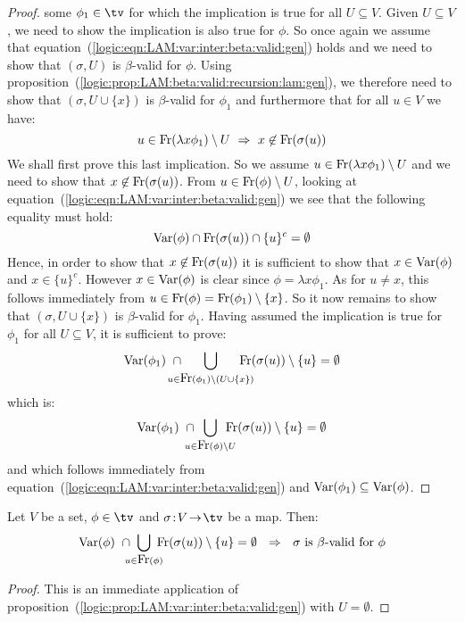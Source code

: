 \begin{proof}
    some $\phi_{1}\in\tv$ for which the implication is true for all
    $U\subseteq V$. Given $U\subseteq V$, we need to show the implication
    is also true for $\phi$. So once again we assume that
    equation~(\ref{logic:eqn:LAM:var:inter:beta:valid:gen}) holds and we
    need to show that $(\sigma,U)$ is $\beta$-valid for $\phi$. Using
    proposition~(\ref{logic:prop:LAM:beta:valid:recursion:lam:gen}), we 
    therefore need to show that $(\sigma, U\cup\{x\})$ is $\beta$-valid
    for $\phi_{1}$ and furthermore that for all $u\in V$ we have:
        \[
            u\in\free(\lambda x\phi_{1})\setminus U
            \ \Rightarrow\ 
            x\not\in\free(\sigma(u))
        \]
    We shall first prove this last implication. So we assume $u\in\mbox{\rm Fr}
    (\lambda x\phi_{1})\setminus U$ and we need to show that 
    $x\not\in\mbox{\rm Fr}(\sigma(u))$. From $u\in\mbox{\rm Fr}(\phi)\setminus U$, looking
    at equation~(\ref{logic:eqn:LAM:var:inter:beta:valid:gen}) we see that
    the following equality must hold:
        \[
            \mbox{\rm Var}(\phi)\cap\mbox{\rm Fr}(\sigma(u))\cap\{u\}^{c}=\emptyset
        \]
    Hence, in order to show that $x\not\in\mbox{\rm Fr}(\sigma(u))$ it is 
    sufficient to show that $x\in\mbox{\rm Var}(\phi)$ and $x\in\{u\}^{c}$.
    However $x\in\mbox{\rm Var}(\phi)$ is clear since $\phi=\lambda x\phi_{1}$.
    As for $u\neq x$, this follows immediately from $u\in\mbox{\rm Fr}(\phi)=
    \mbox{\rm Fr}(\phi_{1})\setminus\{x\}$. So it now remains to show that
    $(\sigma,U\cup\{x\})$ is $\beta$-valid for $\phi_{1}$. Having
    assumed the implication is true for $\phi_{1}$ for all $U\subseteq V$,
    it is sufficient to prove:
        \[
            \var(\phi_{1})\ \cap
            \!\!\!\!\!\!\!\!
            \bigcup_{u\in\free(\phi_{1})\setminus (U\cup\{x\})}
            \!\!\!\!\!\!\!\!
            \free(\sigma(u))\setminus\{u\}
            =\emptyset
        \]
    which is:
        \[
            \var(\phi_{1})\ \cap
            \!\!\!\!\!\!\bigcup_{u\in\free(\phi)\setminus U}\!\!\!\!\!\!
            \free(\sigma(u))\setminus\{u\}
            =\emptyset
        \]
    and which follows immediately from 
    equation~(\ref{logic:eqn:LAM:var:inter:beta:valid:gen}) and $\mbox{\rm Var}(\phi_{1})
    \subseteq\mbox{\rm Var}(\phi)$.
 \end{proof}

\begin{prop}\label{logic:prop:LAM:var:inter:beta:valid}
    Let $V$ be a set, $\phi\in\tv$ and $\sigma\!:\!V\!\to\!\tv$ be a map. Then:
        \[
            \var(\phi)\ \cap
            \!\!\!\!\bigcup_{u\in\free(\phi)}\!\!\!\!
            \free(\sigma(u))\setminus\{u\}
            =\emptyset
            \ \ \Rightarrow\ \ 
            \mbox{$\sigma$ is $\beta$-valid for $\phi$}
        \]
\end{prop}
\begin{proof}
    This is an immediate application of 
    proposition~(\ref{logic:prop:LAM:var:inter:beta:valid:gen}) with $U=\emptyset$.
\end{proof}

